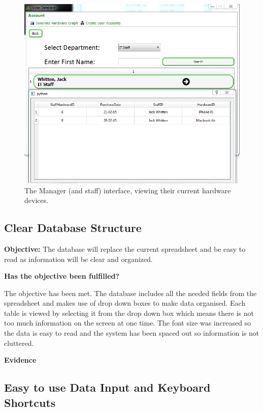 \begin{figure}[H]
    \includegraphics[width=\textwidth]{./Evaluation/Images/database3.png}
    \caption{The Manager (and staff) interface, viewing their current hardware devices.} \label{fig:db3}
\end{figure}

\subsection{Clear Database Structure}

\textbf{Objective:} The database will replace the current spreadsheet and be easy to read as information will be clear and organized.

\textbf{Has the objective been fulfilled?}

The objective has been met. The database includes all the needed fields from the spreadsheet and makes use of drop down boxes to make data organised. Each table is viewed by selecting it from the drop down box which means there is not too much information on the screen at one time. The font size was increased so the data is easy to read and the system has been spaced out so information is not cluttered.

\textbf{Evidence}


\subsection{Easy to use Data Input and Keyboard Shortcuts}

